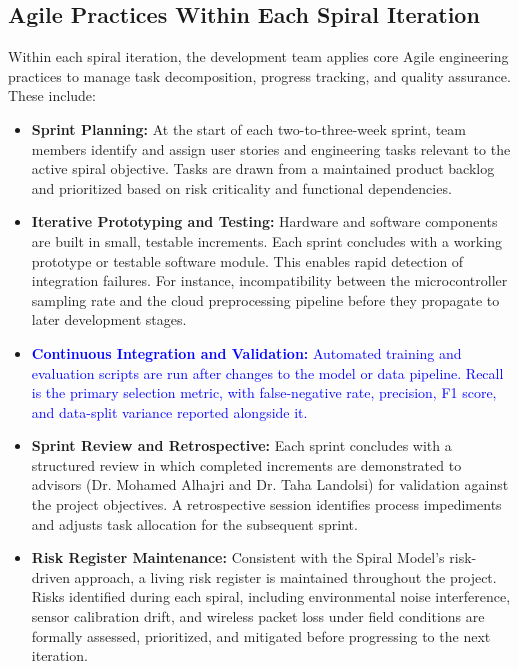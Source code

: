 \documentclass[12pt,a4paper,oneside]{memoir}
\newcommand{\earlierrevision}[1]{\textcolor{blue}{#1}}
\begin{document}
\FloatBarrier

\subsection{Agile Practices Within Each Spiral Iteration}

Within each spiral iteration, the development team applies core Agile engineering practices to manage task decomposition, progress tracking, and quality assurance. These include:

\begin{itemize}
    \item \textbf{Sprint Planning:} At the start of each two-to-three-week sprint, team members
    identify and assign user stories and engineering tasks relevant to the active spiral
    objective. Tasks are drawn from a maintained product backlog and prioritized based on
    risk criticality and functional dependencies.

    \item \textbf{Iterative Prototyping and Testing:} Hardware and software components are built in
    small, testable increments. Each sprint concludes with a working prototype or testable
    software module. This enables rapid detection of integration failures. For instance,
    incompatibility between the microcontroller sampling rate and the cloud preprocessing
    pipeline before they propagate to later development stages.

    \item \earlierrevision{\textbf{Continuous Integration and Validation:} Automated training and evaluation scripts
    are run after changes to the model or data pipeline. Recall is the primary selection metric,
    with false-negative rate, precision, F1 score, and data-split variance reported alongside it.}

    \item \textbf{Sprint Review and Retrospective:} Each sprint concludes with a structured review in
    which completed increments are demonstrated to advisors (Dr. Mohamed Alhajri and Dr.
    Taha Landolsi) for validation against the project objectives. A retrospective session
    identifies process impediments and adjusts task allocation for the subsequent sprint.

    \item \textbf{Risk Register Maintenance:} Consistent with the Spiral Model's risk-driven
    approach, a living risk register is maintained throughout the project. Risks identified
    during each spiral, including environmental noise interference, sensor calibration drift,
    and wireless packet loss under field conditions are formally assessed, prioritized, and
    mitigated before progressing to the next iteration.
\end{itemize}
\end{document}
